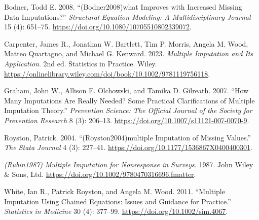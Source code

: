 \documentclass{article}
\newlength{\cslhangindent}
\newenvironment{CSLReferences}[2] %
 {\begin{list}{}{%
  \setlength{\itemindent}{0pt}
  \setlength{\leftmargin}{0pt}
  \setlength{\parsep}{0pt}
  \ifodd #1
   \setlength{\leftmargin}{\cslhangindent}
   \setlength{\itemindent}{-1\cslhangindent}
  \fi
  \setlength{\itemsep}{#2\baselineskip}}}
 {\end{list}}
\begin{document}
\label{refs}
\begin{CSLReferences}{1}{0}
Bodner, Todd E. 2008. {``(Bodner2008)what Improves with Increased
Missing Data Imputations?''} \emph{Structural Equation Modeling: A
Multidisciplinary Journal} 15 (4): 651--75.
\url{https://doi.org/10.1080/10705510802339072}.

Carpenter, James R., Jonathan W. Bartlett, Tim P. Morris, Angela M.
Wood, Matteo Quartagno, and Michael G. Kenward. 2023. \emph{Multiple
Imputation and Its Application}. 2nd ed. Statistics in Practice. Wiley.
\url{https://onlinelibrary.wiley.com/doi/book/10.1002/9781119756118}.

Graham, John W., Allison E. Olchowski, and Tamika D. Gilreath. 2007.
{``How Many Imputations Are Really Needed? Some Practical Clarifications
of Multiple Imputation Theory.''} \emph{Prevention Science: The Official
Journal of the Society for Prevention Research} 8 (3): 206--13.
\url{https://doi.org/10.1007/s11121-007-0070-9}.

Royston, Patrick. 2004. {``(Royston2004)multiple Imputation of Missing
Values.''} \emph{The Stata Journal} 4 (3): 227--41.
\url{https://doi.org/10.1177/1536867X0400400301}.

\emph{(Rubin1987) Multiple Imputation for Nonresponse in Surveys}. 1987.
John Wiley \& Sons, Ltd.
\url{https://doi.org/10.1002/9780470316696.fmatter}.

White, Ian R., Patrick Royston, and Angela M. Wood. 2011. {``Multiple
Imputation Using Chained Equations: Issues and Guidance for Practice.''}
\emph{Statistics in Medicine} 30 (4): 377--99.
\url{https://doi.org/10.1002/sim.4067}.

\end{CSLReferences}



\end{document}
